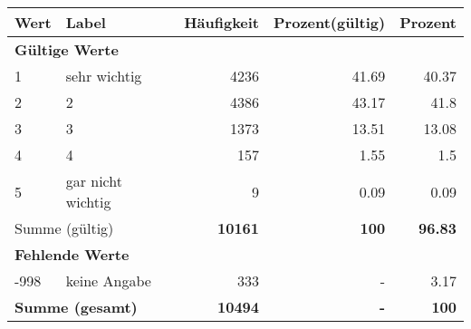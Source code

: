      \begin{longtable}{lXrrr}
     \toprule
     \textbf{Wert} & \textbf{Label} & \textbf{Häufigkeit} & \textbf{Prozent(gültig)} & \textbf{Prozent} \\
     \endhead
     \midrule
     \multicolumn{5}{l}{\textbf{Gültige Werte}}\\

     1 &
     \multicolumn{1}{X}{ sehr wichtig   } &


       \num{4236} &
       \num[round-mode=places,round-precision=2]{41,69} &
         \num[round-mode=places,round-precision=2]{40,37} \\

     2 &
     \multicolumn{1}{X}{ 2   } &


       \num{4386} &
       \num[round-mode=places,round-precision=2]{43,17} &
         \num[round-mode=places,round-precision=2]{41,8} \\

     3 &
     \multicolumn{1}{X}{ 3   } &


       \num{1373} &
       \num[round-mode=places,round-precision=2]{13,51} &
         \num[round-mode=places,round-precision=2]{13,08} \\

     4 &
     \multicolumn{1}{X}{ 4   } &


       \num{157} &
       \num[round-mode=places,round-precision=2]{1,55} &
         \num[round-mode=places,round-precision=2]{1,5} \\

     5 &
     \multicolumn{1}{X}{ gar nicht wichtig   } &


       \num{9} &
       \num[round-mode=places,round-precision=2]{0,09} &
         \num[round-mode=places,round-precision=2]{0,09} \\
     \midrule
     \multicolumn{2}{l}{Summe (gültig)} &
       \textbf{\num{10161}} &
     \textbf{100} &
       \textbf{\num[round-mode=places,round-precision=2]{96,83}} \\
     \multicolumn{5}{l}{\textbf{Fehlende Werte}}\\
       -998 &
       keine Angabe &
         \num{333} &
        - &
         \num[round-mode=places,round-precision=2]{3,17} \\
     \midrule
     \multicolumn{2}{l}{\textbf{Summe (gesamt)}} &
          \textbf{\num{10494}} &
        \textbf{-} &
        \textbf{100} \\
     \bottomrule
     \end{longtable}
     
